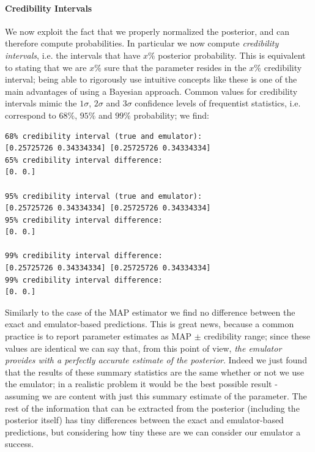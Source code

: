 \paragraph{Credibility Intervals}
We now exploit the fact that we properly normalized the posterior, and can therefore compute probabilities. In particular we now compute \emph{credibility intervals}, i.e. the intervals that have $x\%$ posterior probability. This is equivalent to stating that we are $x\%$ sure that the parameter resides in the $x\%$ credibility interval; being able to rigorously use intuitive concepts like these is one of the main advantages of using a Bayesian approach.
Common values for credibility intervals mimic the $1\sigma$, $2\sigma$ and $3\sigma$ confidence levels of frequentist statistics, i.e. correspond to $68\%$, $95\%$ and $99\%$ probability; we find:
\begin{verbatim}
68% credibility interval (true and emulator):
[0.25725726 0.34334334] [0.25725726 0.34334334]
65% credibility interval difference:
[0. 0.]

95% credibility interval (true and emulator):
[0.25725726 0.34334334] [0.25725726 0.34334334]
95% credibility interval difference:
[0. 0.]

99% credibility interval difference:
[0.25725726 0.34334334] [0.25725726 0.34334334]
99% credibility interval difference:
[0. 0.]
\end{verbatim}
Similarly to the case of the MAP estimator we find no difference between the exact and emulator-based predictions. This is great news, because a common practice is to report parameter estimates as MAP $\pm$ credibility range; since these values are identical we can say that, from this point of view, \emph{the emulator provides with a perfectly accurate estimate of the posterior}. Indeed we just found that the results of these summary statistics are the same whether or not we use the emulator; in a realistic problem it would be the best possible result - assuming we are content with just this summary estimate of the parameter. The rest of the information that can be extracted from the posterior (including the posterior itself) has tiny differences between the exact and emulator-based predictions, but considering how tiny these are we can consider our emulator a success.

